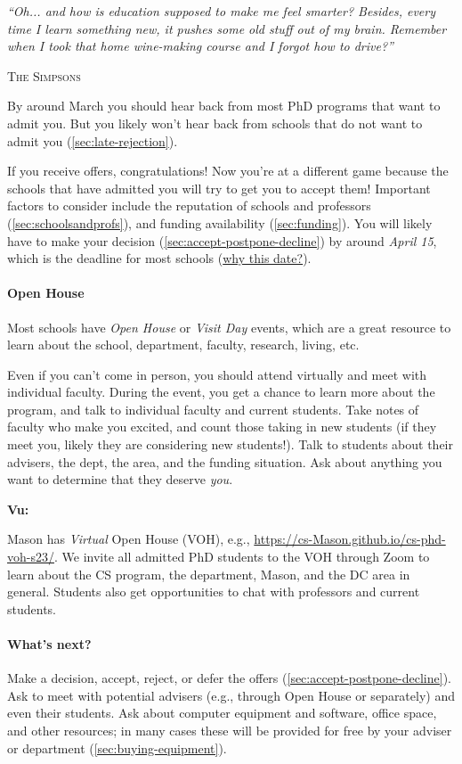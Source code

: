 \documentclass[oneside,11pt,dvipsnames]{book}
\newcommand{\myepigraphsimpsons}[1]{
\epigraph{\vspace{-0.2in} \emph{#1}}{\textsc{The Simpsons}}
}
\newenvironment{commentbox}[1][]{
  \small
  \begin{mybox}
    {\small \textbf{#1}}
  }{
  \end{mybox}
}
\begin{document}
\myepigraphsimpsons{``Oh... and how is education supposed to make me feel smarter? Besides, every time I learn something new, it pushes some old stuff out of my brain. Remember when I took that home wine-making course and I forgot how to drive?''}

By around March you should hear back from most PhD programs that want to admit you. 
But you likely won't hear back from schools that do not want to admit you (\autoref{sec:late-rejection}).

If you receive offers, congratulations!  Now you're at a different game because the schools that have admitted you will try to get you to accept them!  Important factors to consider include the reputation of schools and professors (\autoref{sec:schoolsandprofs}), and funding availability (\autoref{sec:funding}). You will likely have to make your decision (\autoref{sec:accept-postpone-decline}) by around \emph{April 15}, which is the deadline for most schools
(\href{https://cgsnet.org/wp-content/uploads/2024/01/CGS_April15_Resolution_Jan312024.pdf}{why this date?}).

\paragraph{Open House} Most schools have \emph{Open House} or \emph{Visit Day} events, which are a great resource to learn about the school, department, faculty, research, living, etc.

Even if you can't come in person, you should attend virtually and meet with individual faculty. During the event, you get a chance to learn more about the program, and talk to individual faculty and current students.  Take notes of faculty who make you excited, and count those taking in new students (if they meet you, likely they are considering new students!).  Talk to students about their advisers, the dept, the area, and the funding situation.  Ask about anything you want to determine that they deserve \emph{you}.

\begin{commentbox}[Vu:]
  Mason has \emph{Virtual} Open House (VOH), e.g., \url{https://cs-Mason.github.io/cs-phd-voh-s23/}. We invite all admitted PhD students to the VOH through Zoom to learn about the CS program, the department, Mason, and the DC area in general. Students also get opportunities to chat with professors and current students.
\end{commentbox}

\paragraph{What's next?} Make a decision, accept, reject, or defer the offers  (\autoref{sec:accept-postpone-decline}). Ask to meet with potential advisers (e.g., through Open House or separately) and even their students. Ask about computer equipment and software, office space, and other resources; in many cases these will be provided for free by your adviser or department (\autoref{sec:buying-equipment}).
\end{document}
